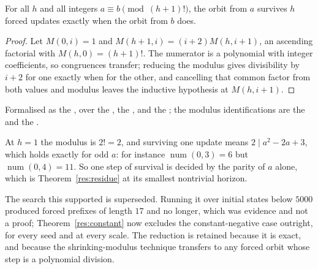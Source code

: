 \documentclass[11pt]{article}
\newcommand{\fnum}{\operatorname{num}}
\begin{document}
\begin{theorem}\label{res:residue}
For all $h$ and all integers $a\equiv b \pmod{(h+1)!}$, the orbit from $a$
survives $h$ forced updates exactly when the orbit from $b$ does.
\end{theorem}

\begin{proof}
Let $M(0,i)=1$ and $M(h+1,i)=(i+2)M(h,i+1)$, an ascending factorial with
$M(h,0)=(h+1)!$.  The numerator is a polynomial with integer coefficients, so
congruences transfer; reducing the modulus gives divisibility by $i+2$ for one
exactly when for the other, and cancelling that common factor from both values
and modulus leaves the inductive hypothesis at $M(h,i+1)$.
\end{proof}

\noindent Formalised as the
, over the
, the
, and the
; the modulus identifications are the
 and the
.

At $h=1$ the modulus is $2!=2$, and surviving one update means
$2\mid a^{2}-2a+3$, which holds exactly for odd $a$: for instance
$\fnum(0,3)=6$ but $\fnum(0,4)=11$.  So one step of survival is decided by the
parity of $a$ alone, which is Theorem~\ref{res:residue} at its smallest
nontrivial horizon.

The search this supported is superseded.  Running it over initial states below
$5000$ produced forced prefixes of length $17$ and no longer, which was
evidence and not a proof; Theorem~\ref{res:constant} now excludes the
constant-negative case outright, for every seed and at every scale.  The
reduction is retained because it is exact, and because the shrinking-modulus
technique transfers to any forced orbit whose step is a polynomial division.
\end{document}
